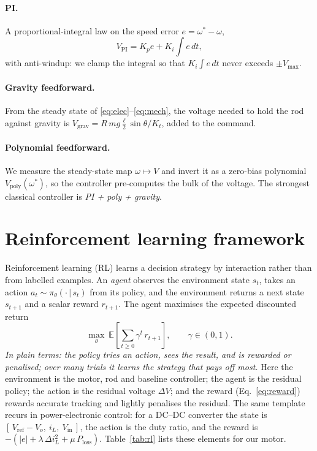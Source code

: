 \documentclass[10pt,twocolumn]{article}
\newcommand{\eli}[1]{\textit{In plain terms: #1}}
\begin{document}
\paragraph{PI.} A proportional-integral law on the speed error
$e=\omega^\ast-\omega$,
\begin{equation}
  V_{\mathrm{PI}} = K_p e + K_i\!\int e\,dt,
  \label{eq:pi}
\end{equation}
with anti-windup: we clamp the integral so that $K_i\!\int e\,dt$
never exceeds $\pm V_{\max}$.

\paragraph{Gravity feedforward.} From the steady state of
\eqref{eq:elec}--\eqref{eq:mech}, the voltage needed to hold the rod
against gravity is $V_{\mathrm{grav}}= R\,m g \tfrac{\ell}{2}\sin\theta /
K_t$, added to the command.

\paragraph{Polynomial feedforward.} We measure the steady-state map
$\omega\mapsto V$ and invert it as a zero-bias polynomial
$V_{\mathrm{poly}}(\omega^\ast)$, so the controller pre-computes the bulk
of the voltage. The strongest classical controller is
\emph{PI + poly + gravity}.

\section{Reinforcement learning framework}
Reinforcement learning (RL) learns a decision strategy by interaction
rather than from labelled examples. An \emph{agent} observes the
environment state $s_t$, takes an action
$a_t\sim\pi_\theta(\cdot\,|\,s_t)$ from its policy, and the environment
returns a next state $s_{t+1}$ and a scalar reward $r_{t+1}$. The agent
maximises the expected discounted return
\begin{equation}
  \max_\theta\ \mathbb{E}\!\left[\sum_{t\ge0}\gamma^t\,r_{t+1}\right],
  \qquad \gamma\in(0,1).
  \label{eq:return}
\end{equation}
\eli{the policy tries an action, sees the result, and is rewarded or
penalised; over many trials it learns the strategy that pays off most.}
Here the environment is the motor, rod and baseline controller; the
agent is the residual policy; the action is the residual voltage
$\Delta V$; and the reward (Eq.~\ref{eq:reward}) rewards accurate
tracking and lightly penalises the residual. The same template recurs in
power-electronic control: for a DC--DC converter the state is
$[\,V_{\mathrm{ref}}-V_o,\ i_L,\ V_{\mathrm{in}}\,]$, the action is the
duty ratio, and the reward is
$-(|e|+\lambda\,\Delta i_L^2+\mu\,P_{\mathrm{loss}})$.
Table~\ref{tab:rl} lists these elements for our motor.
\end{document}
